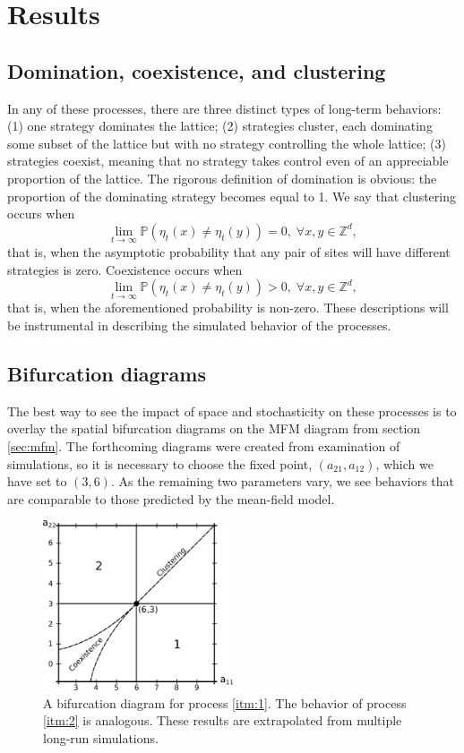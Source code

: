 \documentclass[notitlepage,reqno]{amsart}
\newcommand{\pr}{\mathbb{P}}
\begin{document}
\section{Results}

\subsection{Domination, coexistence, and clustering}
In any of these processes,
there are three distinct types of long-term behaviors: (1) one strategy dominates
the lattice; (2) strategies cluster, each dominating some subset of
the lattice but with no strategy controlling the whole lattice;
(3) strategies coexist, meaning that no strategy takes control even of an
appreciable proportion of the lattice. The rigorous definition of domination is obvious: the proportion of the dominating strategy becomes equal to 1. We say that clustering occurs when
\[
    \lim_{t\to\infty} \pr\left(\eta_t(x) \neq \eta_t(y)\right) = 0,\; \forall x,y\in\mathbb{Z}^d,
\]
that is, when the asymptotic probability that any pair of sites will have different strategies is zero. Coexistence occurs when
\[
    \lim_{t\to\infty} \pr\left(\eta_t(x)\neq\eta_t(y)\right) > 0,\; \forall x,y\in\mathbb{Z}^d,
\]
that is, when the aforementioned probability is non-zero. These descriptions will be instrumental in describing the simulated behavior of the processes.

\subsection{Bifurcation diagrams}
The best way to see the impact of space and stochasticity on these
processes is to overlay the spatial bifurcation diagrams on the MFM
diagram from section \ref{sec:mfm}. The forthcoming diagrams were
created from examination of simulations, so it is necessary to choose
the fixed point, $(a_{21},a_{12})$, which we have set to $(3,6)$. As
the remaining two parameters vary, we see behaviors that are
comparable to those predicted by the mean-field model.

\begin{figure}[h]
\includegraphics[width=0.5\textwidth]{./images/group_1_bifurcation_diagram.eps}
\caption{
A bifurcation diagram for process \ref{itm:1}. The behavior of process \ref{itm:2} is analogous. These results are extrapolated from multiple long-run simulations.
}
\label{fig:group1diagram}
\end{figure}
\end{document}
